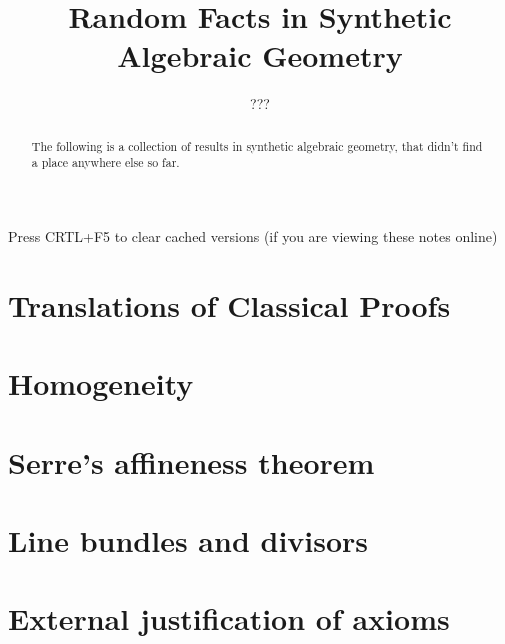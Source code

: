\documentclass{../util/zariski}
\title{Random Facts in Synthetic Algebraic Geometry}
\author{???}
\begin{document}
\maketitle

\begin{center}
  \color{purple}
  \large{Press CRTL+F5 to clear cached versions}
  \large{(if you are viewing these notes online)}
\end{center}

\begin{abstract}
  The following is a collection of results in synthetic algebraic geometry,
  that didn't find a place anywhere else so far.
\end{abstract}

\tableofcontents

\section{Translations of Classical Proofs}


\section{Homogeneity}


\section{Serre's affineness theorem}


\section{Line bundles and divisors}


\section{External justification of axioms}


\printindex

\printbibliography
\end{document}
